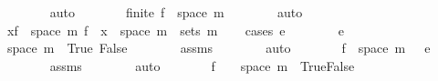 \begin{isabellebody}
\ \ \ \ \ \ \isamarkupfalse%
\ auto\isanewline
\ \ \ \ \isamarkupfalse%
\ \isamarkupfalse%
\ {\isachardoublequoteopen}finite\ {\isacharparenleft}{\kern0pt}f\ {\isacharbackquote}{\kern0pt}\ space\ m{\isacharparenright}{\kern0pt}{\isachardoublequoteclose}\isanewline
\ \ \ \ \ \ \isamarkupfalse%
\ auto\isanewline
\ \ \isamarkupfalse%
\isanewline
{}\isamarkupfalse%
\ \isanewline
\ \ \isamarkupfalse%
\ {\isachardoublequoteopen}{\isasymforall}x{\isasymin}f\ {\isacharbackquote}{\kern0pt}\ space\ m{\isachardot}{\kern0pt}\ f\ {\isacharminus}{\kern0pt}{\isacharbackquote}{\kern0pt}\ {\isacharbraceleft}{\kern0pt}x{\isacharbraceright}{\kern0pt}\ {\isasyminter}\ space\ m\ {\isasymin}\ sets\ m{\isachardoublequoteclose}\isanewline
\ \ \isamarkupfalse%
\ {\isacharparenleft}{\kern0pt}cases\ {\isachardoublequoteopen}e\ {\isacharequal}{\kern0pt}\ {}{\isachardoublequoteclose}{\isacharparenright}{\kern0pt}\isanewline
\ \ \ \ \isamarkupfalse%
\ {\isachardoublequoteopen}e\ {\isacharequal}{\kern0pt}\ {}{\isachardoublequoteclose}\isanewline
\ \ \ \ \isamarkupfalse%
\ {\isachardoublequoteopen}space\ m\ {\isacharequal}{\kern0pt}\ {\isacharbraceleft}{\kern0pt}True{\isacharcomma}{\kern0pt}\ False{\isacharbraceright}{\kern0pt}{\isachardoublequoteclose}\isanewline
\ \ \ \ \ \ \isamarkupfalse%
\ assms{\isacharparenleft}{\kern0pt}{}{\isacharparenright}{\kern0pt}\isanewline
\ \ \ \ \ \ \isamarkupfalse%
\ auto\isanewline
\ \ \ \ \isamarkupfalse%
\ \isamarkupfalse%
\ {\isachardoublequoteopen}f\ {\isacharbackquote}{\kern0pt}\ space\ m\ {\isacharequal}{\kern0pt}\ {\isacharbraceleft}{\kern0pt}{}{\isacharcomma}{\kern0pt}\ e{\isacharbraceright}{\kern0pt}{\isachardoublequoteclose}\isanewline
\ \ \ \ \ \ \isamarkupfalse%
\ assms{\isacharparenleft}{\kern0pt}{}{\isacharparenright}{\kern0pt}\isanewline
\ \ \ \ \ \ \isamarkupfalse%
\ auto\isanewline
\ \ \ \ \isamarkupfalse%
\ \isamarkupfalse%
\ {\isachardoublequoteopen}f\ {\isacharminus}{\kern0pt}{\isacharbackquote}{\kern0pt}\ {\isacharbraceleft}{\kern0pt}{}{\isacharbraceright}{\kern0pt}\ {\isasyminter}\ space\ m\ {\isacharequal}{\kern0pt}\ {\isacharbraceleft}{\kern0pt}True{\isacharcomma}{\kern0pt}False{\isacharbraceright}{\kern0pt}{\isachardoublequoteclose}\isanewline
\ \ \ \ \ \ \isamarkupfalse%

\end{isabellebody}
